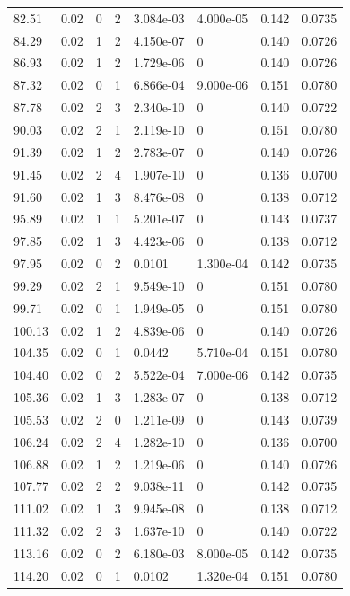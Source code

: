 \documentclass[preview]{standalone}
\begin{document}
{{{\begin{tabular}{L{1.2cm}C{1.2cm} C{0.3cm}C{0.5cm} C{1.4cm}C{1.4cm} C{1.4cm}C{1.4cm}}
  82.51  &  0.02  & 0     &  2 &  3.084e-03  & 4.000e-05  & 0.142 &  0.0735   \\ 
  84.29  &  0.02  & 1     &  2 &  4.150e-07  & 0  & 0.140 &  0.0726   \\ 
  86.93  &  0.02  & 1     &  2 &  1.729e-06  & 0  & 0.140 &  0.0726   \\ 
  87.32  &  0.02  & 0     &  1 &  6.866e-04  & 9.000e-06  & 0.151 &  0.0780   \\ 
  87.78  &  0.02  & 2     &  3 &  2.340e-10  & 0  & 0.140 &  0.0722   \\ 
  90.03  &  0.02  & 2     &  1 &  2.119e-10  & 0  & 0.151 &  0.0780   \\ 
  91.39  &  0.02  & 1     &  2 &  2.783e-07  & 0  & 0.140 &  0.0726   \\ 
  91.45  &  0.02  & 2     &  4 &  1.907e-10  & 0  & 0.136 &  0.0700   \\ 
  91.60  &  0.02  & 1     &  3 &  8.476e-08  & 0  & 0.138 &  0.0712   \\ 
  95.89  &  0.02  & 1     &  1 &  5.201e-07  & 0  & 0.143 &  0.0737   \\ 
  97.85  &  0.02  & 1     &  3 &  4.423e-06  & 0  & 0.138 &  0.0712   \\ 
  97.95  &  0.02  & 0     &  2 &  0.0101  & 1.300e-04  & 0.142 &  0.0735   \\ 
  99.29  &  0.02  & 2     &  1 &  9.549e-10  & 0  & 0.151 &  0.0780   \\ 
  99.71  &  0.02  & 0     &  1 &  1.949e-05  & 0  & 0.151 &  0.0780   \\ 
  100.13  &  0.02  & 1     &  2 &  4.839e-06  & 0  & 0.140 &  0.0726   \\ 
  104.35  &  0.02  & 0     &  1 &  0.0442  & 5.710e-04  & 0.151 &  0.0780   \\ 
  104.40  &  0.02  & 0     &  2 &  5.522e-04  & 7.000e-06  & 0.142 &  0.0735   \\ 
  105.36  &  0.02  & 1     &  3 &  1.283e-07  & 0  & 0.138 &  0.0712   \\ 
  105.53  &  0.02  & 2     &  0 &  1.211e-09  & 0  & 0.143 &  0.0739   \\ 
  106.24  &  0.02  & 2     &  4 &  1.282e-10  & 0  & 0.136 &  0.0700   \\ 
  106.88  &  0.02  & 1     &  2 &  1.219e-06  & 0  & 0.140 &  0.0726   \\ 
  107.77  &  0.02  & 2     &  2 &  9.038e-11  & 0  & 0.142 &  0.0735   \\ 
  111.02  &  0.02  & 1     &  3 &  9.945e-08  & 0  & 0.138 &  0.0712   \\ 
  111.32  &  0.02  & 2     &  3 &  1.637e-10  & 0  & 0.140 &  0.0722   \\ 
  113.16  &  0.02  & 0     &  2 &  6.180e-03  & 8.000e-05  & 0.142 &  0.0735   \\ 
  114.20  &  0.02  & 0     &  1 &  0.0102  & 1.320e-04  & 0.151 &  0.0780   \\ 
\hline 
\end{tabular} 

}}}
\end{document}
